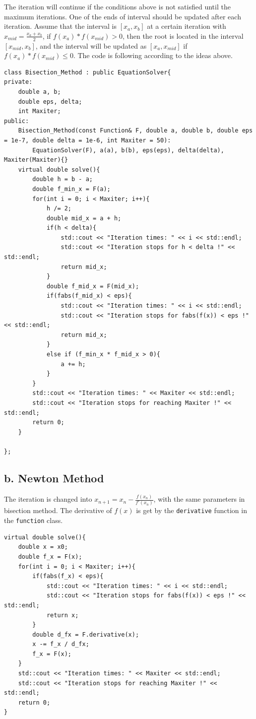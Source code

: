 \documentclass[a4paper]{article}
\begin{document}
The iteration will continue if the conditions above is not satisfied until the maximum iterations. One of the ends of interval should be updated after each iteration. Assume that the interval is $[x_a,x_b]$ at a certain iteration with $x_{mid} = \frac{x_a + x_b}{2}$, 
if $f(x_a) * f(x_{mid}) > 0$, then the root is located in the interval $[x_{mid}, x_b]$, and the interval will be updated as $[x_a, x_{mid}]$ if $f(x_a) * f(x_{mid}) \leq 0$. The code is following according to the
ideas above.
\begin{lstlisting}
class Bisection_Method : public EquationSolver{
private:
    double a, b;
    double eps, delta;
    int Maxiter;
public:
    Bisection_Method(const Function& F, double a, double b, double eps = 1e-7, double delta = 1e-6, int Maxiter = 50):
        EquationSolver(F), a(a), b(b), eps(eps), delta(delta), Maxiter(Maxiter){}
    virtual double solve(){
        double h = b - a;
        double f_min_x = F(a);
        for(int i = 0; i < Maxiter; i++){
            h /= 2;
            double mid_x = a + h;
            if(h < delta){
                std::cout << "Iteration times: " << i << std::endl;
                std::cout << "Iteration stops for h < delta !" << std::endl;
                return mid_x;
            }
            double f_mid_x = F(mid_x);
            if(fabs(f_mid_x) < eps){
                std::cout << "Iteration times: " << i << std::endl;
                std::cout << "Iteration stops for fabs(f(x)) < eps !" << std::endl;
                return mid_x;
            }
            else if (f_min_x * f_mid_x > 0){
                a += h;
            }
        }
        std::cout << "Iteration times: " << Maxiter << std::endl;
        std::cout << "Iteration stops for reaching Maxiter !" << std::endl;
        return 0;
    }

};
\end{lstlisting}

\subsection*{b. Newton Method}
The iteration is changed into $x_{n+1} = x_n - \frac{f(x_n)}{f'(x_n)}$, with the same parameters in bisection method. The derivative of $f(x)$ is get by the \verb|derivative| function 
in the \verb|function| class.
\begin{lstlisting}
virtual double solve(){
    double x = x0;
    double f_x = F(x);
    for(int i = 0; i < Maxiter; i++){
        if(fabs(f_x) < eps){
            std::cout << "Iteration times: " << i << std::endl;
            std::cout << "Iteration stops for fabs(f(x)) < eps !" << std::endl;
            return x;
        }
        double d_fx = F.derivative(x);
        x -= f_x / d_fx;
        f_x = F(x);
    }
    std::cout << "Iteration times: " << Maxiter << std::endl;
    std::cout << "Iteration stops for reaching Maxiter !" << std::endl;
    return 0;
}
\end{lstlisting}
\end{document}
